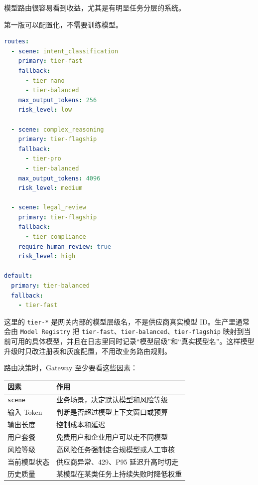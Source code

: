 \documentclass[9pt,a4paper,twocolumn]{ctexart}
\begin{document}
模型路由很容易看到收益，尤其是有明显任务分层的系统。



第一版可以配置化，不需要训练模型。



\begin{lstlisting}[language=yaml]
routes:
  - scene: intent_classification
    primary: tier-fast
    fallback:
      - tier-nano
      - tier-balanced
    max_output_tokens: 256
    risk_level: low

  - scene: complex_reasoning
    primary: tier-flagship
    fallback:
      - tier-pro
      - tier-balanced
    max_output_tokens: 4096
    risk_level: medium

  - scene: legal_review
    primary: tier-flagship
    fallback:
      - tier-compliance
    require_human_review: true
    risk_level: high

default:
  primary: tier-balanced
  fallback:
    - tier-fast
\end{lstlisting}



这里的 \texttt{tier-*} 是网关内部的模型层级名，不是供应商真实模型 ID。生产里通常会由 \texttt{Model Registry} 把 \texttt{tier-fast}、\texttt{tier-balanced}、\texttt{tier-flagship} 映射到当前可用的具体模型，并且在日志里同时记录“模型层级”和“真实模型名”。这样模型升级时只改注册表和灰度配置，不用改业务路由规则。



路由决策时，Gateway 至少要看这些因素：


{\footnotesize
\begin{tabular}{|p{}|p{}|}
\hline
\textbf{因素} & \textbf{作用} \\
\hline
\texttt{scene} & 业务场景，决定默认模型和风险等级 \\
\hline
输入 Token & 判断是否超过模型上下文窗口或预算 \\
\hline
输出长度 & 控制成本和延迟 \\
\hline
用户套餐 & 免费用户和企业用户可以走不同模型 \\
\hline
风险等级 & 高风险任务强制走合规模型或人工审核 \\
\hline
当前模型状态 & 供应商异常、429、P95 延迟升高时切走 \\
\hline
历史质量 & 某模型在某类任务上持续失败时降低权重 \\
\hline
\end{tabular}
}
\end{document}
